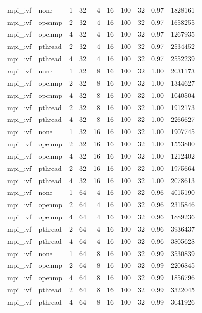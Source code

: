 \documentclass[a4paper]{article}
\begin{document}
{\begin{longtable}{lllrrrrrrr}
mpi\_ivf & none & 1 & 32 & 4 & 16 & 100 & 32 & 0.97 & 1828161 \\
mpi\_ivf & openmp & 2 & 32 & 4 & 16 & 100 & 32 & 0.97 & 1658255 \\
mpi\_ivf & openmp & 4 & 32 & 4 & 16 & 100 & 32 & 0.97 & 1267935 \\
mpi\_ivf & pthread & 2 & 32 & 4 & 16 & 100 & 32 & 0.97 & 2534452 \\
mpi\_ivf & pthread & 4 & 32 & 4 & 16 & 100 & 32 & 0.97 & 2552239 \\
mpi\_ivf & none & 1 & 32 & 8 & 16 & 100 & 32 & 1.00 & 2031173 \\
mpi\_ivf & openmp & 2 & 32 & 8 & 16 & 100 & 32 & 1.00 & 1344627 \\
mpi\_ivf & openmp & 4 & 32 & 8 & 16 & 100 & 32 & 1.00 & 1040504 \\
mpi\_ivf & pthread & 2 & 32 & 8 & 16 & 100 & 32 & 1.00 & 1912173 \\
mpi\_ivf & pthread & 4 & 32 & 8 & 16 & 100 & 32 & 1.00 & 2266627 \\
mpi\_ivf & none & 1 & 32 & 16 & 16 & 100 & 32 & 1.00 & 1907745 \\
mpi\_ivf & openmp & 2 & 32 & 16 & 16 & 100 & 32 & 1.00 & 1553800 \\
mpi\_ivf & openmp & 4 & 32 & 16 & 16 & 100 & 32 & 1.00 & 1212402 \\
mpi\_ivf & pthread & 2 & 32 & 16 & 16 & 100 & 32 & 1.00 & 1975664 \\
mpi\_ivf & pthread & 4 & 32 & 16 & 16 & 100 & 32 & 1.00 & 2078613 \\
mpi\_ivf & none & 1 & 64 & 4 & 16 & 100 & 32 & 0.96 & 4015190 \\
mpi\_ivf & openmp & 2 & 64 & 4 & 16 & 100 & 32 & 0.96 & 2315846 \\
mpi\_ivf & openmp & 4 & 64 & 4 & 16 & 100 & 32 & 0.96 & 1889236 \\
mpi\_ivf & pthread & 2 & 64 & 4 & 16 & 100 & 32 & 0.96 & 3936437 \\
mpi\_ivf & pthread & 4 & 64 & 4 & 16 & 100 & 32 & 0.96 & 3805628 \\
mpi\_ivf & none & 1 & 64 & 8 & 16 & 100 & 32 & 0.99 & 3530839 \\
mpi\_ivf & openmp & 2 & 64 & 8 & 16 & 100 & 32 & 0.99 & 2206845 \\
mpi\_ivf & openmp & 4 & 64 & 8 & 16 & 100 & 32 & 0.99 & 1856796 \\
mpi\_ivf & pthread & 2 & 64 & 8 & 16 & 100 & 32 & 0.99 & 3322045 \\
mpi\_ivf & pthread & 4 & 64 & 8 & 16 & 100 & 32 & 0.99 & 3041926 \\

\end{longtable}}
\end{document}
